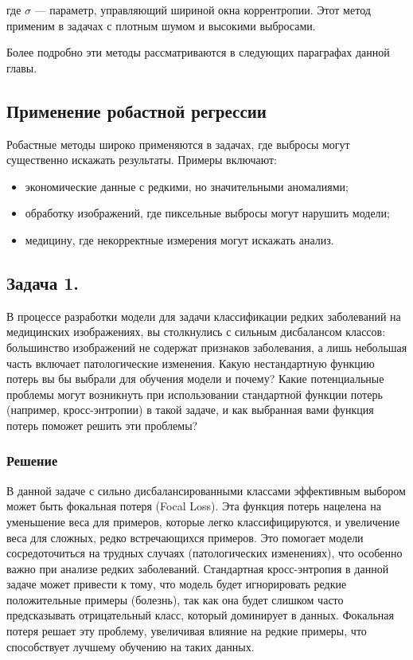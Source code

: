 где $\sigma$ — параметр, управляющий шириной окна коррентропии. Этот метод применим в задачах с плотным шумом и высокими выбросами.

Более подробно эти методы рассматриваются в следующих параграфах данной главы.

\subsection*{Применение робастной регрессии}
Робастные методы широко применяются в задачах, где выбросы могут существенно искажать результаты. Примеры включают:
\begin{itemize}
    \item экономические данные с редкими, но значительными аномалиями;
    \item обработку изображений, где пиксельные выбросы могут нарушить модели;
    \item медицину, где некорректные измерения могут искажать анализ.
\end{itemize}


\subsection*{Задача 1.}
В процессе разработки модели для задачи классификации редких заболеваний на медицинских изображениях, вы столкнулись с сильным дисбалансом классов: большинство изображений не содержат признаков заболевания, а лишь небольшая часть включает патологические изменения. Какую нестандартную функцию потерь вы бы выбрали для обучения модели и почему? Какие потенциальные проблемы могут возникнуть при использовании стандартной функции потерь (например, кросс-энтропии) в такой задаче, и как выбранная вами функция потерь поможет решить эти проблемы?

\subsubsection*{Решение}
В данной задаче с сильно дисбалансированными классами эффективным выбором может быть фокальная потеря (Focal Loss). Эта функция потерь нацелена на уменьшение веса для примеров, которые легко классифицируются, и увеличение веса для сложных, редко встречающихся примеров. Это помогает модели сосредоточиться на трудных случаях (патологических изменениях), что особенно важно при анализе редких заболеваний. Стандартная кросс-энтропия в данной задаче может привести к тому, что модель будет игнорировать редкие положительные примеры (болезнь), так как она будет слишком часто предсказывать отрицательный класс, который доминирует в данных. Фокальная потеря решает эту проблему, увеличивая влияние на редкие примеры, что способствует лучшему обучению на таких данных.

